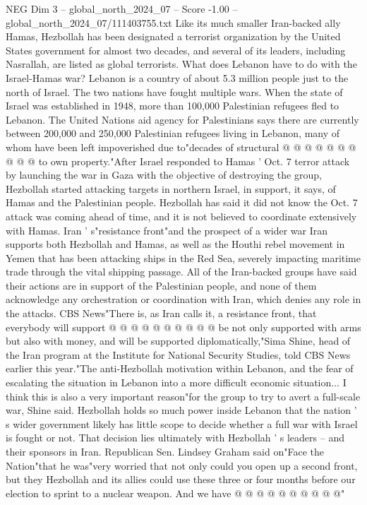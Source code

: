 \begin{textsample}{NEG Dim 3 – global\_north\_2024\_07 – Score -1.00 – global\_north\_2024\_07/111403755.txt}
Like its much smaller Iran-backed ally Hamas, Hezbollah has been designated a terrorist organization by the United States government for almost two decades, and several of its leaders, including Nasrallah, are listed as global terrorists.
What does Lebanon have to do with the Israel-Hamas war?
Lebanon is a country of about 5.3 million people just to the north of Israel.
The two nations have fought multiple wars.
When the state of Israel was established in 1948, more than 100,000 Palestinian refugees fled to Lebanon.
The United Nations aid agency for Palestinians says there are currently between 200,000 and 250,000 Palestinian refugees living in Lebanon, many of whom have been left impoverished due to"decades of structural @ @ @ @ @ @ @ @ @ @ to own property."After Israel responded to Hamas ' Oct. 7 terror attack by launching the war in Gaza with the objective of destroying the group, Hezbollah started attacking targets in northern Israel, in support, it says, of Hamas and the Palestinian people.
Hezbollah has said it did not know the Oct. 7 attack was coming ahead of time, and it is not believed to coordinate extensively with Hamas.
Iran ' s"resistance front"and the prospect of a wider war Iran supports both Hezbollah and Hamas, as well as the Houthi rebel movement in Yemen that has been attacking ships in the Red Sea, severely impacting maritime trade through the vital shipping passage.
All of the Iran-backed groups have said their actions are in support of the Palestinian people, and none of them acknowledge any orchestration or coordination with Iran, which denies any role in the attacks.
CBS News"There is, as Iran calls it, a resistance front, that everybody will support @ @ @ @ @ @ @ @ @ @ be not only supported with arms but also with money, and will be supported diplomatically,"Sima Shine, head of the Iran program at the Institute for National Security Studies, told CBS News earlier this year."The anti-Hezbollah motivation within Lebanon, and the fear of escalating the situation in Lebanon into a more difficult economic situation...
I think this is also a very important reason"for the group to try to avert a full-scale war, Shine said.
Hezbollah holds so much power inside Lebanon that the nation ' s wider government likely has little scope to decide whether a full war with Israel is fought or not.
That decision lies ultimately with Hezbollah ' s leaders -- and their sponsors in Iran.
Republican Sen.
Lindsey Graham said on"Face the Nation"that he was"very worried that not only could you open up a second front, but they Hezbollah and its allies could use these three or four months before our election to sprint to a nuclear weapon.
And we have @ @ @ @ @ @ @ @ @ @"

\end{textsample}
